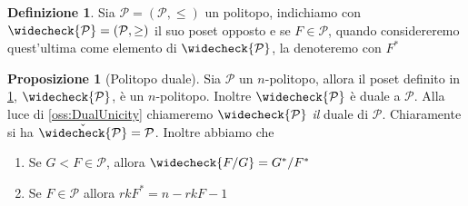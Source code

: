 \documentclass[a4paper,12pt]{report}
\newcommand{\p}{\mathcal{P}}
\theoremstyle{plain}
\theoremstyle{definition}
\newtheorem{defin}[teo]{Definizione}
\newtheorem{prop}[teo]{Proposizione}
\newcommand\locallabel[1]{\label{\currentprefix_#1}}
\begin{document}
\begin{defin}
\label{def:DualPolytope}
Sia $\p=(\p,\leq)$ un politopo, indichiamo con $\widecheck{\p}=(\p,\geq)$ il suo poset opposto e se $F\in\p$, quando considereremo quest'ultima
come elemento di $\widecheck{\p}$, la denoteremo con $F^*$
\end{defin}

\def\currentprefix{prop:DualPolytope}
\begin{prop}[Politopo duale]
\label{prop:DualPolytope}
Sia $\p$ un $n$-politopo, allora il poset definito in \ref{def:DualPolytope}, $\widecheck{\p}$, \`e un $n$-politopo. Inoltre $\widecheck{\p}$ \`e duale a
$\p$. Alla luce di \ref{oss:DualUnicity} chiameremo $\widecheck{\p}$ \emph{il} duale di $\p$. Chiaramente si ha $\check{\widecheck{\p}}=\p$.
Inoltre abbiamo che
\begin{enumerate}
\item\locallabel{1} Se $G<F\in\p$, allora $\widecheck{F/G}=G^*/F^*$
\item\locallabel{2} Se $F\in\p$ allora $rkF^*=n-rkF-1$
\end{enumerate}
\end{prop}
\newcommand\localprefix{tuasorella}
\end{document}
